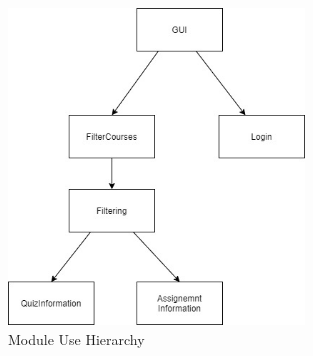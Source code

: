 \documentclass[12pt, titlepage]{article}
\begin{document}
\begin{figure}[H]
    \centering
    \includegraphics[width=0.7\textwidth]{hierarchy.jpg}
    \caption{Module Use Hierarchy}
    \label{hierarchyFig}
\end{figure}
    
\end{document}

